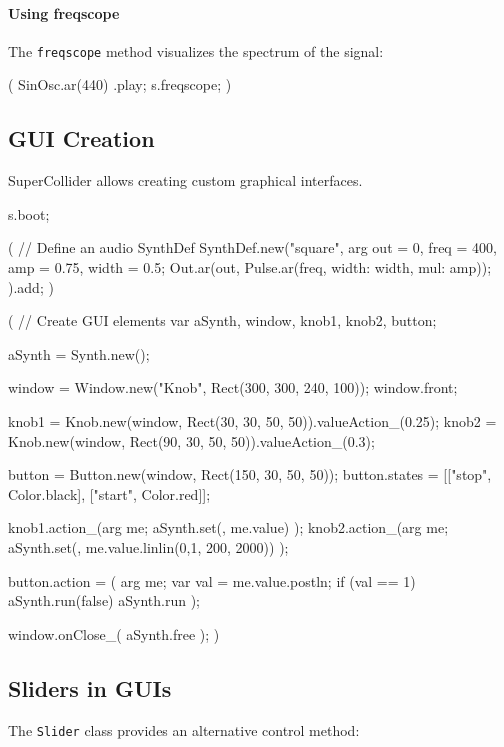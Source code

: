 \paragraph{Using freqscope}

The \texttt{freqscope} method visualizes the spectrum of the signal:

\begin{supercollider*}
(
{ SinOsc.ar(440) }.play;
s.freqscope;
)
\end{supercollider*}

\subsection{GUI Creation}

SuperCollider allows creating custom graphical interfaces.

\begin{supercollider*}
s.boot;

(
// Define an audio SynthDef
SynthDef.new("square", { arg out = 0, freq = 400, amp = 0.75, width = 0.5;
    Out.ar(out, Pulse.ar(freq, width: width, mul: amp));
}).add;
)

(
// Create GUI elements
var aSynth, window, knob1, knob2, button;

aSynth = Synth.new(\square); 

window = Window.new("Knob", Rect(300, 300, 240, 100));
window.front;

knob1 = Knob.new(window, Rect(30, 30, 50, 50)).valueAction_(0.25);
knob2 = Knob.new(window, Rect(90, 30, 50, 50)).valueAction_(0.3);

button = Button.new(window, Rect(150, 30, 50, 50));
button.states = [["stop", Color.black], ["start", Color.red]];

knob1.action_({arg me; aSynth.set(\amp, me.value) });
knob2.action_({arg me; aSynth.set(\freq, me.value.linlin(0,1, 200, 2000)) });

button.action = ({ arg me;
    var val = me.value.postln;
    if (val == 1) { aSynth.run(false) } { aSynth.run }
});

window.onClose_({ aSynth.free });
)
\end{supercollider*}

\subsection{Sliders in GUIs}

The \texttt{Slider} class provides an alternative control method:

